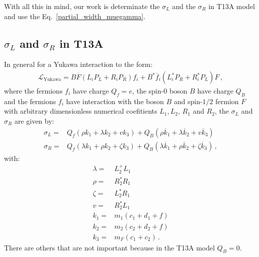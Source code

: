 With all this in mind, our work is determinate the $\sigma_L$ and the $\sigma_R$ in T13A model and use the Eq.~\eqref{partial_width_muegamma}.

\subsection{$\sigma_L$ and $\sigma_R$ in T13A}

In general for a Yukawa interaction to the form:
\begin{align}
\label{eq:general-yukawa-lagrangian}
\mathcal{L}_{\text{Yukawa}}=B\overline{F}(L_iP_L+R_iP_R)f_i+B^*\overline{f}_i(L_i^*P_R+R_i^*P_L)F\,,
\end{align}
where the fermions $f_i$ have charge $Q_f=e$, the spin-$0$ boson $B$ have charge $Q_B$ and the fermions $f_i$ have interaction with the boson $B$ and spin-$1/2$ fermion $F$ with arbitrary dimensionless numerical coefitients $L_1,L_2$, $R_1$ and $R_2$, the $\sigma_L$ and $\sigma_R$ are given by:
\begin{align}
\sigma_L=& Q_f(\rho k_1 +\lambda k_2 + v k_3)+Q_B(\rho \overline{k}_1 + \lambda \overline{k}_2 + v \overline{k}_3)\\
\sigma_R=& Q_f(\lambda k_1 +\rho k_2 + \zeta k_3)+Q_B(\lambda \overline{k}_1 + \rho \overline{k}_2 + \zeta \overline{k}_3)\,,
\end{align} 
with:
\begin{align}
\lambda=&L_2^+L_1\\
\rho=&R_2^*R_1\\
\zeta=&L_2^*R_1\\
v=&R_2^*L_1\\
k_1=&m_1(c_1+d_1+f)\\
k_2=&m_2(c_2+d_2+f)\\
k_3=&m_F(c_1+c_2)\,.
\end{align}
There are others that are not important because in the T13A model $Q_B=0$.

